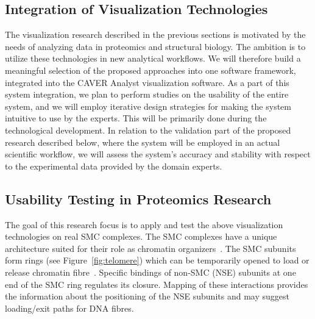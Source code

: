 \documentclass[11pt,a4paper,titlepage,oneside,onecolumn]{article}
\begin{document}





\subsection{Integration of Visualization Technologies}
\vspace{-4mm}
The visualization research described in the previous sections is motivated by the needs of analyzing data in proteomics and structural biology. 
The ambition is to utilize these technologies in new analytical workflows.
We will therefore build a meaningful selection of the proposed approaches into one software framework, integrated into the CAVER Analyst visualization software. 
As a part of this system integration, we plan to perform studies on the usability of the entire system, and we will employ iterative design strategies for making the system intuitive to use by the experts. 
This will be primarily done during the technological development. 
In relation to the validation part of the proposed research described below, where the system will be employed in an actual scientific workflow, we will assess the system's accuracy and stability with respect to the experimental data provided by the domain experts.


\subsection{Usability Testing in Proteomics Research}
\vspace{-4mm}
\label{sec:smc}
The goal of this research focus is to apply and test the above visualization technologies on real SMC complexes. 
The SMC complexes have a unique architecture suited for their role as chromatin organizers~\cite{Palecek2015}. 
The SMC subunits form rings (see Figure~\ref{fig:telomere}) which can be temporarily opened to load or release chromatin fibre~\cite{Haering2016}. 
Specific bindings of non-SMC (NSE) subunits at one end of the SMC ring regulates its closure. 
Mapping of these interactions provides the information about the positioning of the NSE subunits and may suggest loading/exit paths for DNA fibres.
\end{document}
